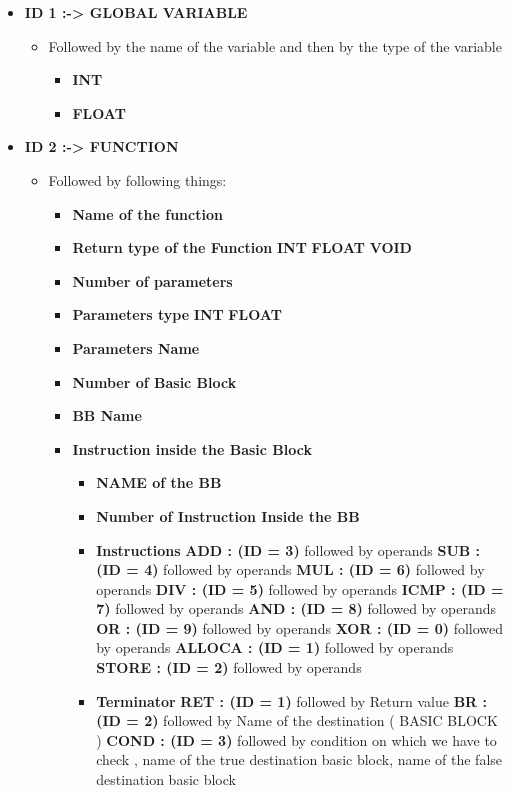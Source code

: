 \documentclass{book}
\begin{document}
\begin{itemize}
	\item \textbf{ID 1 :->  GLOBAL VARIABLE }
	\begin{itemize}
		\item 	Followed by the name of the variable and then by the type of the variable\newline
		\begin{itemize}
			\item  \textbf{INT} 
			\item  \textbf{FLOAT} \newline
		\end{itemize}
	\end{itemize}

	\item  \textbf{ID 2 :-> FUNCTION}
	\begin{itemize}
		\item Followed by following things:\newline
		\begin{itemize}
			\item \textbf{Name of the function}
			\item \textbf{Return type of the Function}
			\subitem \textbf{INT}  
			\subitem \textbf{FLOAT} 
			\subitem \textbf{VOID}
			\item \textbf{Number of parameters}
			\item \textbf{Parameters type}
			\subitem \textbf{INT}
			\subitem \textbf{FLOAT}
			\item \textbf{Parameters Name}
			\item \textbf{Number of Basic Block}
			\item \textbf{BB Name}
			\item \textbf{Instruction inside the Basic Block}
			\begin{itemize}
				\item \textbf{NAME of the BB}
				\item \textbf{Number of Instruction Inside the BB}
				\item \textbf{Instructions}		
				\subitem \textbf{ADD : (ID = 3)} followed by operands
				\subitem \textbf{SUB : (ID = 4)} followed by operands
				\subitem \textbf{MUL : (ID = 6)} followed by operands
				\subitem \textbf{DIV : (ID = 5)} followed by operands
				\subitem \textbf{ICMP : (ID = 7)} followed by operands
				\subitem \textbf{AND : (ID = 8)} followed by operands
				\subitem \textbf{OR : (ID = 9)} followed by operands
				\subitem \textbf{XOR : (ID = 0)} followed by operands
				\subitem \textbf{ALLOCA : (ID = 1)} followed by operands
				\subitem \textbf{STORE : (ID = 2)} followed by operands
				\item  \textbf{Terminator}
				\subitem \textbf{RET : (ID = 1)} followed by Return value
				\subitem \textbf{BR : (ID = 2)} followed by Name of the destination ( BASIC BLOCK )
				\subitem \textbf{COND : (ID = 3)} followed by condition on which we have to check , name of the true destination basic block, name of the false destination basic block
			\end{itemize}
		\end{itemize}
	\end{itemize} 
\end{itemize}
\end{document}
